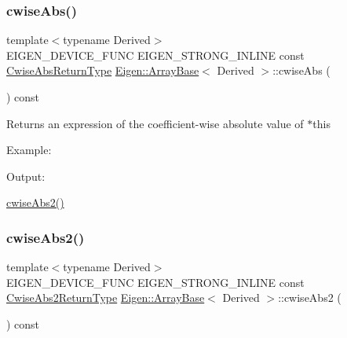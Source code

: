 \subsubsection{\texorpdfstring{cwiseAbs()}{cwiseAbs()}}
{\footnotesize\ttfamily template$<$typename Derived$>$ \\
E\+I\+G\+E\+N\+\_\+\+D\+E\+V\+I\+C\+E\+\_\+\+F\+U\+NC E\+I\+G\+E\+N\+\_\+\+S\+T\+R\+O\+N\+G\+\_\+\+I\+N\+L\+I\+NE const \mbox{\hyperlink{class_eigen_1_1_cwise_unary_op}{Cwise\+Abs\+Return\+Type}} \mbox{\hyperlink{class_eigen_1_1_array_base}{Eigen\+::\+Array\+Base}}$<$ Derived $>$\+::cwise\+Abs (\begin{DoxyParamCaption}{ }\end{DoxyParamCaption}) const\hspace{0.3cm}{\ttfamily [inline]}}

\begin{DoxyReturn}{Returns}
an expression of the coefficient-\/wise absolute value of {\ttfamily $\ast$this} 
\end{DoxyReturn}
Example\+: 
\begin{DoxyCodeInclude}{0}
\end{DoxyCodeInclude}
 Output\+: 
\begin{DoxyVerbInclude}
\end{DoxyVerbInclude}
 \mbox{\hyperlink{class_eigen_1_1_array_base_aab34a23028035fd99c8b1a3ef54443f7}{cwise\+Abs2()}} \mbox{\label{class_eigen_1_1_array_base_aab34a23028035fd99c8b1a3ef54443f7}} 
\subsubsection{\texorpdfstring{cwiseAbs2()}{cwiseAbs2()}}
{\footnotesize\ttfamily template$<$typename Derived$>$ \\
E\+I\+G\+E\+N\+\_\+\+D\+E\+V\+I\+C\+E\+\_\+\+F\+U\+NC E\+I\+G\+E\+N\+\_\+\+S\+T\+R\+O\+N\+G\+\_\+\+I\+N\+L\+I\+NE const \mbox{\hyperlink{class_eigen_1_1_cwise_unary_op}{Cwise\+Abs2\+Return\+Type}} \mbox{\hyperlink{class_eigen_1_1_array_base}{Eigen\+::\+Array\+Base}}$<$ Derived $>$\+::cwise\+Abs2 (\begin{DoxyParamCaption}{ }\end{DoxyParamCaption}) const\hspace{0.3cm}{\ttfamily [inline]}}


